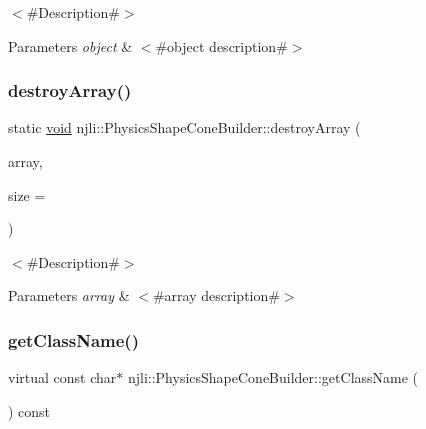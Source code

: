 $<$\#\+Description\#$>$


\begin{DoxyParams}{Parameters}
{\em object} & $<$\#object description\#$>$ \\
\hline
\end{DoxyParams}
\mbox{\label{classnjli_1_1_physics_shape_cone_builder_a90298bcea1676d8c3655e7b0cf243555}} 
\subsubsection{\texorpdfstring{destroy\+Array()}{destroyArray()}}
{\footnotesize\ttfamily static \mbox{\hyperlink{_thread_8h_af1e856da2e658414cb2456cb6f7ebc66}{void}} njli\+::\+Physics\+Shape\+Cone\+Builder\+::destroy\+Array (\begin{DoxyParamCaption}\item[{\mbox{\hyperlink{classnjli_1_1_physics_shape_cone_builder}{Physics\+Shape\+Cone\+Builder}} $\ast$$\ast$}]{array,  }\item[{const \mbox{\hyperlink{_util_8h_a10e94b422ef0c20dcdec20d31a1f5049}{u32}}}]{size = {} }\end{DoxyParamCaption})\hspace{0.3cm}{\ttfamily [static]}}

$<$\#\+Description\#$>$


\begin{DoxyParams}{Parameters}
{\em array} & $<$\#array description\#$>$ \\
\hline
\end{DoxyParams}
\mbox{\label{classnjli_1_1_physics_shape_cone_builder_a68948fc1dd3683ea335c5bf6645dcc1a}} 
\subsubsection{\texorpdfstring{get\+Class\+Name()}{getClassName()}}
{\footnotesize\ttfamily virtual const char$\ast$ njli\+::\+Physics\+Shape\+Cone\+Builder\+::get\+Class\+Name (\begin{DoxyParamCaption}{ }\end{DoxyParamCaption}) const\hspace{0.3cm}{\ttfamily [virtual]}}

